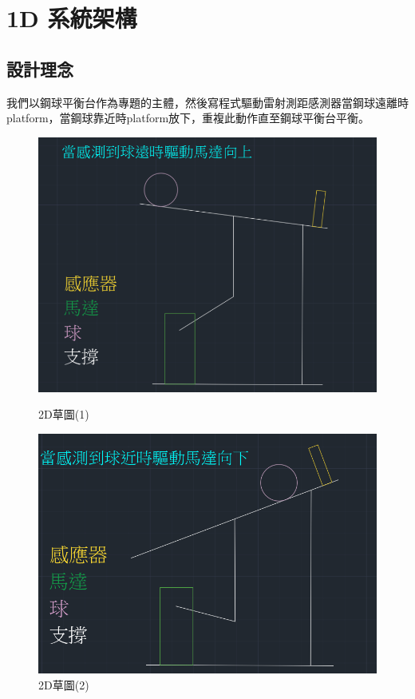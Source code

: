 \section*{1D 系統架構}

\subsection*{設計理念}

我們以鋼球平衡台作為專題的主體，然後寫程式驅動雷射測距感測器當鋼球遠離時platform，當鋼球靠近時platform放下，重複此動作直至鋼球平衡台平衡。

\begin{figure}[h!]
    \centering
    \begin{minipage}[b]{0.45\textwidth}
        \centering
        \includegraphics[width=\textwidth,height=0.2\textheight]{./../images/螢幕擷取畫面 2024-05-22 181158.png}
        \caption{2D草圖(1)}
        \label{fig:6-2.1}
    \end{minipage}
    \hfill
    \begin{minipage}[b]{0.45\textwidth}
        \centering
        \includegraphics[width=\textwidth,height=0.2\textheight]{./../images/螢幕擷取畫面 2024-05-22 180925.png} 
        \caption{2D草圖(2)}
        \label{fig:6-2.2}
    \end{minipage}
\end{figure}

